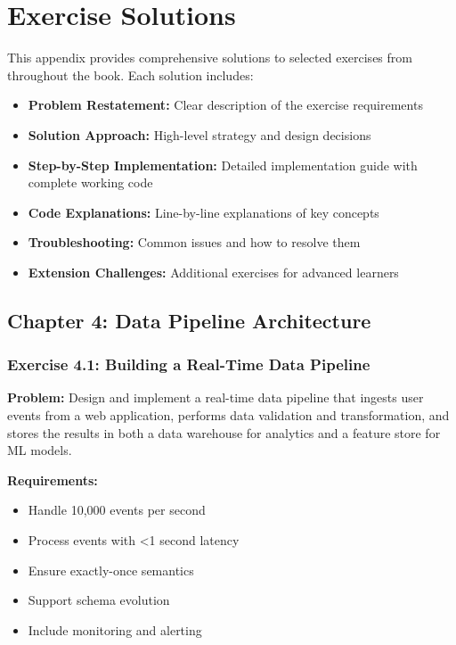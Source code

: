 \chapter{Exercise Solutions}
\label{app:solutions}

This appendix provides comprehensive solutions to selected exercises from throughout the book. Each solution includes:

\begin{itemize}
    \item \textbf{Problem Restatement:} Clear description of the exercise requirements
    \item \textbf{Solution Approach:} High-level strategy and design decisions
    \item \textbf{Step-by-Step Implementation:} Detailed implementation guide with complete working code
    \item \textbf{Code Explanations:} Line-by-line explanations of key concepts
    \item \textbf{Troubleshooting:} Common issues and how to resolve them
    \item \textbf{Extension Challenges:} Additional exercises for advanced learners
\end{itemize}

\section{Chapter 4: Data Pipeline Architecture}

\subsection{Exercise 4.1: Building a Real-Time Data Pipeline}

\textbf{Problem:} Design and implement a real-time data pipeline that ingests user events from a web application, performs data validation and transformation, and stores the results in both a data warehouse for analytics and a feature store for ML models.

\textbf{Requirements:}
\begin{itemize}
    \item Handle 10,000 events per second
    \item Process events with <1 second latency
    \item Ensure exactly-once semantics
    \item Support schema evolution
    \item Include monitoring and alerting
\end{itemize}

